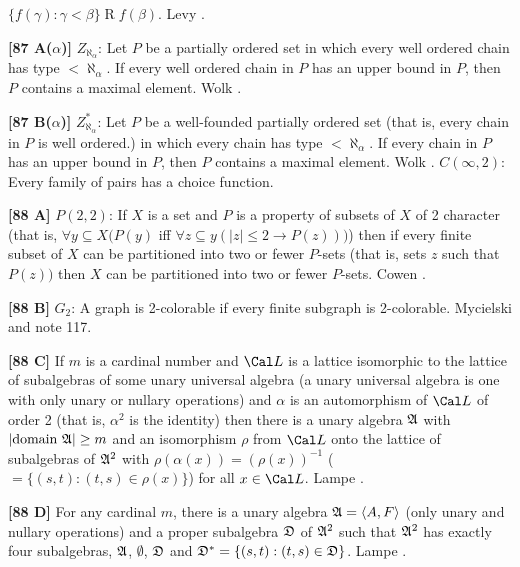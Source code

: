 $\{f(\gamma): \gamma < \beta\}\mathrel R f(\beta)$. \ac{Levy} \cite{1964}.
\smallskip
\item{}{\bf [87 A($\alpha$)]} $Z_{\aleph_{\alpha }}$: Let $P$ be a
partially ordered set in which every well ordered chain has type
$< \aleph_{\alpha}$. If every well ordered chain in $P$ has an upper
bound in $P$, then $P$ contains a maximal element. \ac{Wolk} \cite{1983}.
\smallskip
\item{}{\bf [87 B($\alpha$)]} $Z^{*}_{\aleph_{\alpha}}$: Let $P$ be a
well-founded partially ordered set (that is, every chain in $P$ is
well ordered.) in which every chain has type $< \aleph_{\alpha}$. If
every chain in $P$ has an upper bound in $P$, then $P$ contains a
maximal element. \ac{Wolk} \cite{1983}.
\medskip
{}  $C(\infty ,2)$:  Every family of pairs has a
choice function.
\smallskip
\item{}{\bf [88 A]}  $P(2,2)$:  If $X$ is a set and $P$ is a property of
subsets of $X$ of 2 character (that is, $\forall y\subseteq X (P(y)$ iff
$\forall z\subseteq y (|z|\le 2 \rightarrow P(z)))$) then if every finite
subset of $X$ can be partitioned into two or fewer $P$-sets (that is, sets
$z$ such that $P(z))$ then $X$ can be partitioned into two or fewer
$P$-sets.  \ac{Cowen} \cite{1982}.
\smallskip
\item{}{\bf [88 B]}  $G_{2}$: A graph is 2-colorable if every  finite
subgraph is 2-colorable.  \ac{Mycielski} \cite{1961} and note 117.
\smallskip
\item{}{\bf [88 C]} If $m$ is a cardinal number and ${\Cal L}$ is a
lattice isomorphic  to  the  lattice  of  subalgebras of some unary
universal algebra (a unary universal algebra is one with  only
unary or nullary operations) and $\alpha$ is an automorphism of ${\Cal L}$
of order 2 (that is, $\alpha ^{2}$ is the  identity) then there is a unary
algebra $\frak A$  with $|\hbox{domain }\frak A| \ge m$ and an
isomorphism $\rho$ from ${\Cal L}$ onto the lattice of subalgebras of
$\frak A^{2}$ with $\rho (\alpha (x)) = (\rho (x))^{-1}$ ($=
\{(s,t) : (t,s)\in \rho (x)\}$) for all $x\in {\Cal L}$. \ac{Lampe}
\cite{1974}.
\smallskip
\item{}{\bf [88 D]} For any cardinal $m$, there is a unary algebra $\frak A
= \langle A,F\rangle$ (only unary and nullary operations) and a proper
subalgebra $\frak D$ of $\frak A^{2}$ such that $\frak A^{2}$ has
exactly four subalgebras, $\frak A$, $\emptyset$, $\frak D$
and $\frak D^{*}= \{(s,t): (t,s)\in\frak D\}$.  \ac{Lampe} \cite{1974}.
